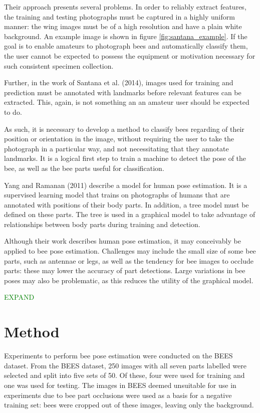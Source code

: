 \documentclass[11pt, oneside]{report}
\newcommand{\pcomment}[1]{\textcolor{green}{#1}}
\begin{document}
    Their approach presents several problems. In order to reliably extract features, the training and testing photographs must be captured in a highly uniform manner: the wing images must be of a high resolution and have a plain white background. An example image is shown in figure \ref{fig:santana_example}. If the goal is to enable amateurs to photograph bees and automatically classify them, the user cannot be expected to possess the equipment or motivation necessary for such consistent specimen collection.

    Further, in the work of Santana et al. (2014), images used for training and prediction must be annotated with landmarks before relevant features can be extracted. This, again, is not something an an amateur user should be expected to do.

    As such, it is necessary to develop a method to classify bees regarding of their position or orientation in the image, without requiring the user to take the photograph in a particular way, and not necessitating that they annotate landmarks. It is a logical first step to train a machine to detect the pose of the bee, as well as the bee parts useful for classification.

    Yang and Ramanan (2011) describe a model for human pose estimation. It is a supervised learning model that trains on photographs of humans that are annotated with positions of their body parts. In addition, a tree model must be defined on these parts. The tree is used in a graphical model to take advantage of relationships between body parts during training and detection.

    Although their work describes human pose estimation, it may conceivably be applied to bee pose estimation. Challenges may include the small size of some bee parts, such as antennae or legs, as well as the tendency for bee images to occlude parts: these may lower the accuracy of part detections. Large variations in bee poses may also be problematic, as this reduces the utility of the graphical model.

    \pcomment{EXPAND}

\chapter{Method}
    Experiments to perform bee pose estimation were conducted on the BEES dataset. From the BEES dataset, 250 images with all seven parts labelled were selected and split into five sets of 50. Of these, four were used for training and one was used for testing. The images in BEES deemed unsuitable for use in experiments due to bee part occlusions were used as a basis for a negative training set: bees were cropped out of these images, leaving only the background.
\end{document}
